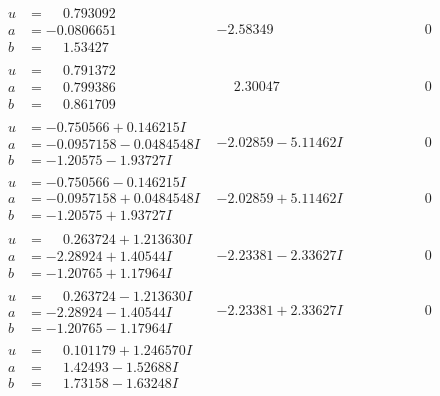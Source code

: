 \documentclass[1p]{elsarticle_modified}
\theoremstyle{definition}
\begin{document}
$$\begin{array}{c|c|c}
\begin{aligned}
u &= \phantom{-}0.793092\phantom{ +0.000000I} \\
a &= -0.0806651\phantom{ +0.000000I} \\
b &= \phantom{-}1.53427\phantom{ +0.000000I}\end{aligned}
 & -2.58349\phantom{ +0.000000I} & \phantom{-0.000000 } 0 \\ \hline\begin{aligned}
u &= \phantom{-}0.791372\phantom{ +0.000000I} \\
a &= \phantom{-}0.799386\phantom{ +0.000000I} \\
b &= \phantom{-}0.861709\phantom{ +0.000000I}\end{aligned}
 & \phantom{-}2.30047\phantom{ +0.000000I} & \phantom{-0.000000 } 0 \\ \hline\begin{aligned}
u &= -0.750566 + 0.146215 I \\
a &= -0.0957158 - 0.0484548 I \\
b &= -1.20575 - 1.93727 I\end{aligned}
 & -2.02859 - 5.11462 I & \phantom{-0.000000 } 0 \\ \hline\begin{aligned}
u &= -0.750566 - 0.146215 I \\
a &= -0.0957158 + 0.0484548 I \\
b &= -1.20575 + 1.93727 I\end{aligned}
 & -2.02859 + 5.11462 I & \phantom{-0.000000 } 0 \\ \hline\begin{aligned}
u &= \phantom{-}0.263724 + 1.213630 I \\
a &= -2.28924 + 1.40544 I \\
b &= -1.20765 + 1.17964 I\end{aligned}
 & -2.23381 - 2.33627 I & \phantom{-0.000000 } 0 \\ \hline\begin{aligned}
u &= \phantom{-}0.263724 - 1.213630 I \\
a &= -2.28924 - 1.40544 I \\
b &= -1.20765 - 1.17964 I\end{aligned}
 & -2.23381 + 2.33627 I & \phantom{-0.000000 } 0 \\ \hline\begin{aligned}
u &= \phantom{-}0.101179 + 1.246570 I \\
a &= \phantom{-}1.42493 - 1.52688 I \\
b &= \phantom{-}1.73158 - 1.63248 I\end{aligned}

\end{array}$$
\end{document}
